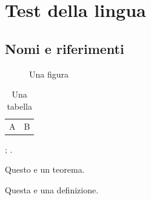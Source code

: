 \documentclass[it, font = none, mode = simple]{elegantbook-l3}
\begin{document}
\frontmatter
\tableofcontents

\mainmatter
\chapter{Test della lingua}
\section{Nomi e riferimenti}

\begin{figure}[htbp]
  \centering
  \fbox{\rule{0pt}{2cm}\rule{3cm}{0pt}}
  \caption{Una figura}\label{fig:language-test}
\end{figure}

\begin{table}[htbp]
  \centering
  \caption{Una tabella}\label{tab:language-test}
  \begin{tabular}{cc}
    A & B
  \end{tabular}
\end{table}

; .

\begin{theorem}[Esempio]
  Questo e un teorema.
\end{theorem}

\begin{definition}
  Questa e una definizione.
\end{definition}
\end{document}
